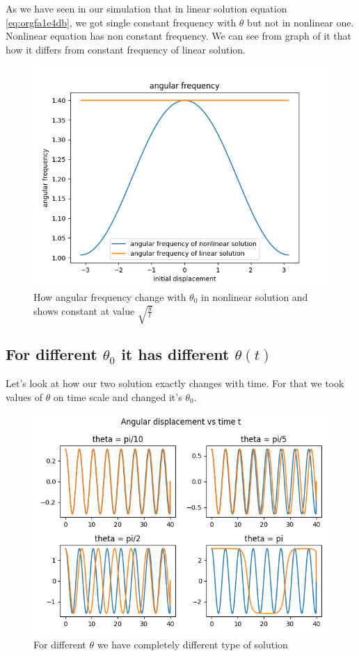 \documentclass{article}
\begin{document}
As we have seen in our simulation that in linear solution equation \ref{eq:orgfa1e4db}, we got single constant frequency with \(\theta\) but not in nonlinear one. Nonlinear equation has non constant frequency. We can see from graph of it that how it differs from constant frequency of linear solution. \cite{sobamowo2020exact}\cite{johannessen2014analytical}

\begin{figure}[htbp]
\centering
\includegraphics[width=0.8 \textwidth]{../graphs/angfre.png}
\caption{\label{fig:orga18c2fb}How angular frequency change with \(\theta_{0}\) in nonlinear solution and shows constant at value \(\sqrt{\frac{g}{l}}\)}
\end{figure}


\subsection{For different \(\theta_{0}\) it has different \(\theta(t)\)}
\label{sec:org082cc5a}

Let's look at how our two solution exactly changes with time. For that we took values of \(\theta\) on time scale and changed it's \(\theta_{0}\).

\begin{figure}[htbp]
\centering
\includegraphics[width=0.8 \textwidth]{../graphs/thetawitht.png}
\caption{\label{fig:org894ab25}For different \(\theta\) we have completely different type of solution}
\end{figure}
\end{document}
